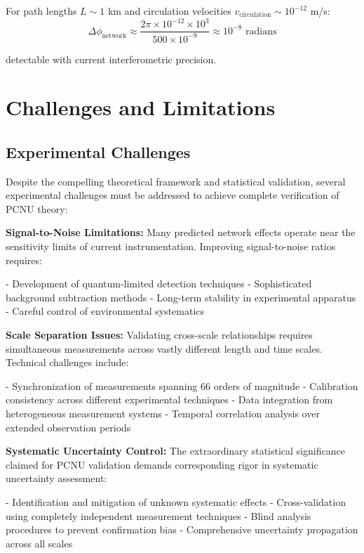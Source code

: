 \documentclass[11pt,a4paper]{article}
\begin{document}
For path lengths $L \sim 1$ km and circulation velocities $v_{\text{circulation}} \sim 10^{-12}$ m/s:
\begin{equation}
\Delta \phi_{\text{network}} \approx \frac{2\pi \times 10^{-12} \times 10^3}{500 \times 10^{-9}} \approx 10^{-8} \text{ radians}
\label{eq:expected_phase_shift}
\end{equation}

detectable with current interferometric precision.

\section{Challenges and Limitations}

\subsection{Experimental Challenges}

Despite the compelling theoretical framework and statistical validation, several experimental challenges must be addressed to achieve complete verification of PCNU theory:

\textbf{Signal-to-Noise Limitations:}
Many predicted network effects operate near the sensitivity limits of current instrumentation. Improving signal-to-noise ratios requires:

- Development of quantum-limited detection techniques
- Sophisticated background subtraction methods
- Long-term stability in experimental apparatus
- Careful control of environmental systematics

\textbf{Scale Separation Issues:}
Validating cross-scale relationships requires simultaneous measurements across vastly different length and time scales. Technical challenges include:

- Synchronization of measurements spanning 66 orders of magnitude
- Calibration consistency across different experimental techniques
- Data integration from heterogeneous measurement systems
- Temporal correlation analysis over extended observation periods

\textbf{Systematic Uncertainty Control:}
The extraordinary statistical significance claimed for PCNU validation demands corresponding rigor in systematic uncertainty assessment:

- Identification and mitigation of unknown systematic effects
- Cross-validation using completely independent measurement techniques
- Blind analysis procedures to prevent confirmation bias
- Comprehensive uncertainty propagation across all scales
\end{document}
